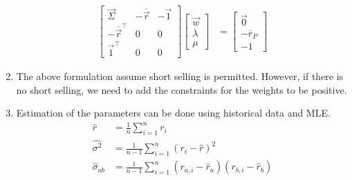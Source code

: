 \documentclass[12pt,twoside]{article}
\begin{document}
\begin{enumerate}
	\begin{align*}
		\begin{bmatrix}
			\vec{\Sigma}						& 	- \overline{\vec{r}}	& - \vec{1} \\
		 	- \overline{\vec{r}}^\top	& 0 								& 0\\
			\vec{1}^\top						& 0 								& 0
		\end{bmatrix}
		\begin{bmatrix}
		\vec{w}\\
		\lambda \\
		\mu
		\end{bmatrix}
		&= \begin{bmatrix}
		\vec{0}		\\
		-\overline{r}_P\\
		-1
		\end{bmatrix}
	\end{align*}
	
	\item The above formulation assume short selling is permitted. However, if there is no short selling, we need to add the constraints for the weights to be positive.
	
	\item Estimation of the parameters can be done using historical data and MLE.
		\begin{align*}
			\hat{r} 				& = \frac{1}{n}\sum_{i=1}^n r_i\\
			\hat{\sigma^2}	& = \frac{1}{n-1}\sum_{i=1}^n (r_i-\hat{r})^2\\
			\hat{\sigma}_{ab}& = \frac{1}{n-1} \sum_{i=1}^n (r_{a,i}-\hat{r}_a)(r_{b,i}-\hat{r}_b)
		\end{align*}



\end{enumerate}
\end{document}
